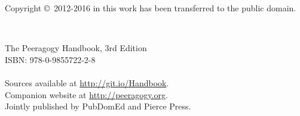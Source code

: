 \documentclass[ebook, 12pt, twoside]{memoir}
\newcommand\blankpage{%
    \null
    \thispagestyle{empty}%
    \addtocounter{page}{-1}%
    \newpage}
\begin{document}
\begin{center}
{\large Copyright \copyright\ {2012-2016} in this work has been transferred to the public domain.\\[.2cm]}
\end{center}
\quad \\[3.5in] 
\begin{center}
\large{The Peeragogy Handbook, 3rd Edition\\
ISBN: 978-0-9855722-2-8}
\quad \\[.2in] 
\quad \\[.2in]
\large{Sources available at \url{http://git.io/Handbook}.\\
Companion website at \url{http://peeragogy.org}.}
\quad \\[.2in]
\large{Jointly published by PubDomEd and Pierce Press.}

\end{center}
\thispagestyle{empty}
\clearpage



\frontmatter

\pagestyle{empty}
\thispagestyle{empty}
\setcounter{page}{-1}
{
\changepage{10mm}{}{}{}{}{-10mm}{}{}{}{}{}{}{}{}
%
\renewcommand{\baselinestretch}{1.2}\normalsize
\tableofcontents*
\renewcommand{\baselinestretch}{1.0}\normalsize
}
\end{document}

